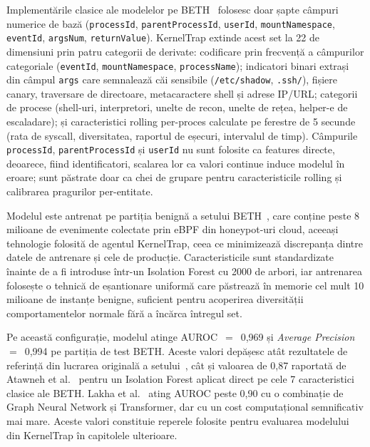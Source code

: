 Implementările clasice ale modelelor pe BETH~\cite{atawneh2025symmetry} folosesc doar șapte
câmpuri numerice de bază (\texttt{processId}, \texttt{parentProcessId}, \texttt{userId},
\texttt{mountNamespace}, \texttt{eventId}, \texttt{argsNum}, \texttt{returnValue}). KernelTrap
extinde acest set la 22 de dimensiuni prin patru categorii de derivate: codificare prin
frecvență a câmpurilor categoriale (\texttt{eventId}, \texttt{mountNamespace},
\texttt{processName}); indicatori binari extrași din câmpul \texttt{args} care semnalează căi
sensibile (\texttt{/etc/shadow}, \texttt{.ssh/}), fișiere canary, traversare de directoare,
metacaractere shell și adrese IP/URL; categorii de procese (shell-uri, interpretori, unelte de
recon, unelte de rețea, helper-e de escaladare); și caracteristici rolling per-proces calculate
pe ferestre de 5 secunde (rata de syscall, diversitatea, raportul de eșecuri, intervalul de
timp). Câmpurile \texttt{processId}, \texttt{parentProcessId} și \texttt{userId} nu sunt
folosite ca features directe, deoarece, fiind identificatori, scalarea lor ca valori continue induce
modelul în eroare; sunt păstrate doar ca chei de grupare pentru caracteristicile rolling și
calibrarea pragurilor per-entitate.

Modelul este antrenat pe partiția benignă a setului BETH~\cite{highnam2021beth}, care conține
peste 8 milioane de evenimente colectate prin eBPF din honeypot-uri cloud, aceeași tehnologie
folosită de agentul KernelTrap, ceea ce minimizează discrepanța dintre datele de antrenare și
cele de producție. Caracteristicile sunt standardizate înainte de a fi introduse într-un
Isolation Forest cu 2000 de arbori, iar antrenarea folosește o tehnică de eșantionare uniformă
care păstrează în memorie cel mult 10 milioane de instanțe benigne, suficient pentru
acoperirea diversității comportamentelor normale fără a încărca întregul set.

Pe această configurație, modelul atinge AUROC~$=$~0,969 și \textit{Average Precision}~$=$~0,994
pe partiția de test BETH. Aceste valori depășesc atât rezultatele de referință din lucrarea
originală a setului~\cite{highnam2021beth}, cât și valoarea de 0,87 raportată de Atawneh et
al.~\cite{atawneh2025symmetry} pentru un Isolation Forest aplicat direct pe cele 7
caracteristici clasice ale BETH. Lakha et al.~\cite{lakha2022beth} ating AUROC peste 0,90 cu
o combinație de Graph Neural Network și Transformer, dar cu un cost computațional
semnificativ mai mare. Aceste valori constituie reperele folosite pentru evaluarea modelului
din KernelTrap în capitolele ulterioare.

